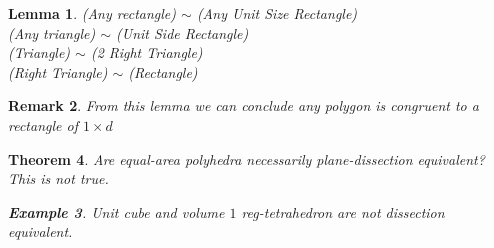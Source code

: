 \documentclass[a4paper]{article}
\newtheorem{thm}{Theorem}[section]
\newtheorem{lem}[thm]{Lemma}
\newtheorem{eg}[thm]{Example}
\newtheorem{rmk}[thm]{Remark}
\begin{document}
\begin{lem}
    (Any rectangle) $\sim$ (Any Unit Size Rectangle)\\(Any triangle) $\sim$ (Unit Side Rectangle)\\(Triangle) $\sim$ (2 Right Triangle)\\ (Right Triangle) $\sim$ (Rectangle)
\end{lem}
\begin{rmk}
    From this lemma we can conclude any polygon is congruent to a rectangle of $1\times d$
\end{rmk}
\begin{thm}
    Are equal-area polyhedra necessarily plane-dissection equivalent? This is not true.
    \begin{eg}
        Unit cube and volume $1$ reg-tetrahedron are not dissection equivalent.\\
    \end{eg}
\end{thm}
\end{document}
